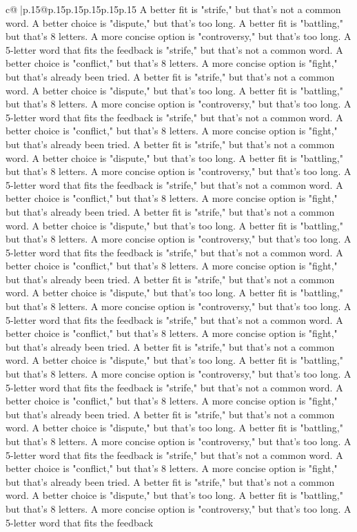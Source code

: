\documentclass{article}
\begin{document}
{\begin{supertabular}{c@{$\;$}|p{.15\linewidth}@{}p{.15\linewidth}p{.15\linewidth}p{.15\linewidth}p{.15\linewidth}p{.15\linewidth}}
{{{A better fit is "strife," but that's not a common word. A better choice is "dispute," but that's too long. A better fit is "battling," but that's 8 letters. A more concise option is "controversy," but that's too long. A 5{-}letter word that fits the feedback is "strife," but that's not a common word. A better choice is "conflict," but that's 8 letters. A more concise option is "fight," but that's already been tried. A better fit is "strife," but that's not a common word. A better choice is "dispute," but that's too long. A better fit is "battling," but that's 8 letters. A more concise option is "controversy," but that's too long. A 5{-}letter word that fits the feedback is "strife," but that's not a common word. A better choice is "conflict," but that's 8 letters. A more concise option is "fight," but that's already been tried. A better fit is "strife," but that's not a common word. A better choice is "dispute," but that's too long. A better fit is "battling," but that's 8 letters. A more concise option is "controversy," but that's too long. A 5{-}letter word that fits the feedback is "strife," but that's not a common word. A better choice is "conflict," but that's 8 letters. A more concise option is "fight," but that's already been tried. A better fit is "strife," but that's not a common word. A better choice is "dispute," but that's too long. A better fit is "battling," but that's 8 letters. A more concise option is "controversy," but that's too long. A 5{-}letter word that fits the feedback is "strife," but that's not a common word. A better choice is "conflict," but that's 8 letters. A more concise option is "fight," but that's already been tried. A better fit is "strife," but that's not a common word. A better choice is "dispute," but that's too long. A better fit is "battling," but that's 8 letters. A more concise option is "controversy," but that's too long. A 5{-}letter word that fits the feedback is "strife," but that's not a common word. A better choice is "conflict," but that's 8 letters. A more concise option is "fight," but that's already been tried. A better fit is "strife," but that's not a common word. A better choice is "dispute," but that's too long. A better fit is "battling," but that's 8 letters. A more concise option is "controversy," but that's too long. A 5{-}letter word that fits the feedback is "strife," but that's not a common word. A better choice is "conflict," but that's 8 letters. A more concise option is "fight," but that's already been tried. A better fit is "strife," but that's not a common word. A better choice is "dispute," but that's too long. A better fit is "battling," but that's 8 letters. A more concise option is "controversy," but that's too long. A 5{-}letter word that fits the feedback is "strife," but that's not a common word. A better choice is "conflict," but that's 8 letters. A more concise option is "fight," but that's already been tried. A better fit is "strife," but that's not a common word. A better choice is "dispute," but that's too long. A better fit is "battling," but that's 8 letters. A more concise option is "controversy," but that's too long. A 5{-}letter word that fits the feedback }}}
\end{supertabular}}
\end{document}
